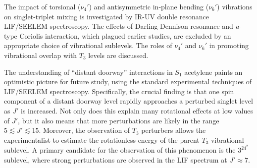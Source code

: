 

The impact of torsional ($\nu_4'$) and antisymmetric in-plane bending
($\nu_6'$) vibrations on singlet-triplet mixing is investigated by
IR-UV double resonance LIF/SEELEM spectroscopy.  The effects of
Darling-Dennison resonance and \emph{a}-type Coriolis interaction,
which plagued earlier studies, are excluded by an appropriate choice
of vibrational sublevels.  The roles of $\nu_4'$ and $\nu_6'$ in
promoting vibrational overlap with $T_3$ levels are discussed.

The understanding of ``distant doorway'' interactions in $S_1$
acetylene paints an optimistic picture for future study, using the
standard experimental techniques of LIF/SEELEM spectroscopy.
Specifically, the crucial finding is that one spin component of a
distant doorway level rapidly approaches a perturbed singlet level as
$J'$ is increased.  Not only does this explain many rotational effects
at low values of $J'$, but it also means that more perturbations are
likely in the range $5 \lesssim J' \lesssim 15$.  Moreover, the
observation of $T_3$ perturbers allows the experimentalist to estimate
the rotationless energy of the parent $T_3$ vibrational sublevel.  A
primary candidate for the observation of this phenomenon is the
$3^24^2$  sublevel, where strong perturbations are observed in
the LIF spectrum at $J' \approx 7$.


